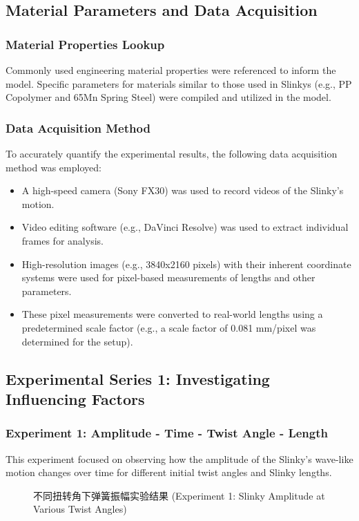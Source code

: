 \documentclass{mcmthesis}  %
\begin{document}
\subsection{Material Parameters and Data Acquisition}

\subsubsection{Material Properties Lookup}
Commonly used engineering material properties were referenced to inform the model. Specific parameters for materials similar to those used in Slinkys (e.g., PP Copolymer and 65Mn Spring Steel) were compiled and utilized in the model.

\subsubsection{Data Acquisition Method}
To accurately quantify the experimental results, the following data acquisition method was employed:
\begin{itemize}
    \item A high-speed camera (Sony FX30) was used to record videos of the Slinky's motion.
    \item Video editing software (e.g., DaVinci Resolve) was used to extract individual frames for analysis.
    \item High-resolution images (e.g., 3840x2160 pixels) with their inherent coordinate systems were used for pixel-based measurements of lengths and other parameters.
    \item These pixel measurements were converted to real-world lengths using a predetermined scale factor (e.g., a scale factor of 0.081 mm/pixel was determined for the setup).
\end{itemize}

\subsection{Experimental Series 1: Investigating Influencing Factors}

\subsubsection{Experiment 1: Amplitude - Time - Twist Angle - Length}
This experiment focused on observing how the amplitude of the Slinky's wave-like motion changes over time for different initial twist angles and Slinky lengths.

\begin{figure}[h!]
    \centering
    \caption{不同扭转角下弹簧振幅实验结果 (Experiment 1: Slinky Amplitude at Various Twist Angles)}
    \label{fig:exp1_amplitude_twists}
\end{figure}
\end{document}
